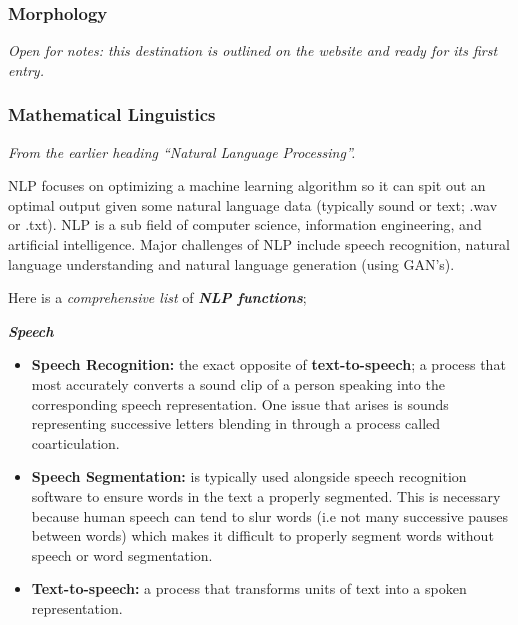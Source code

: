 \documentclass{article}
\begin{document}
\subsubsection{Morphology}\label{sec:morphology}
\textit{Open for notes: this destination is outlined on the website and ready for its first entry.}

\subsubsection{Mathematical Linguistics}\label{sec:mathematical-linguistics}

\textit{From the earlier heading ``Natural Language Processing''.}

NLP focuses on optimizing a machine learning algorithm so it can spit out an optimal output given some natural language data (typically sound or text; .wav or .txt). NLP is a sub field of computer science, information engineering, and artificial intelligence. Major challenges of NLP include speech recognition, natural language understanding and natural language generation (using GAN's). 

\vspace{0.20cm}

\hspace{-0.68cm} Here is a \textit{comprehensive list} of \textit{\textbf{NLP functions}};

\vspace{0.35cm}

\hspace{-0.4cm} \textbf{\textit{Speech}}

\vspace{0.25cm}

\begin{itemize}
    \item \textbf{Speech Recognition:} the exact opposite of \textbf{text-to-speech}; a process that most accurately converts a sound clip of a person speaking into the corresponding speech representation. One issue that arises is sounds representing successive letters blending in through a process called coarticulation. 
    \item \textbf{Speech Segmentation:} is typically used alongside speech recognition software to ensure words in the text a properly segmented. This is necessary because human speech can tend to slur words (i.e not many successive pauses between words) which makes it difficult to properly segment words without speech or word segmentation. 
    \item \textbf{Text-to-speech:} a process that transforms units of text into a spoken representation. 
\end{itemize}
\end{document}

